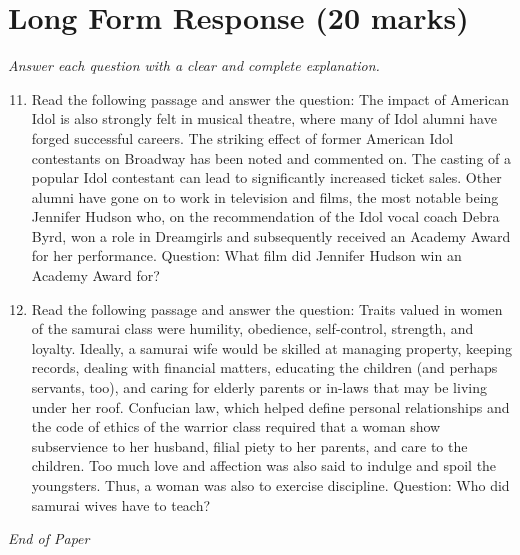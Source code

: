 \documentclass[12pt]{article}
\begin{document}
\section*{Long Form Response (20 marks)}
\textit{Answer each question with a clear and complete explanation.}
\begin{enumerate}[label=\arabic*.]
\setcounter{enumi}{10}
\item Read the following passage and answer the question: The impact of American Idol is also strongly felt in musical theatre, where many of Idol alumni have forged successful careers. The striking effect of former American Idol contestants on Broadway has been noted and commented on. The casting of a popular Idol contestant can lead to significantly increased ticket sales. Other alumni have gone on to work in television and films, the most notable being Jennifer Hudson who, on the recommendation of the Idol vocal coach Debra Byrd, won a role in Dreamgirls and subsequently received an Academy Award for her performance. Question: What film did Jennifer Hudson win an Academy Award for?
\item Read the following passage and answer the question: Traits valued in women of the samurai class were humility, obedience, self-control, strength, and loyalty. Ideally, a samurai wife would be skilled at managing property, keeping records, dealing with financial matters, educating the children (and perhaps servants, too), and caring for elderly parents or in-laws that may be living under her roof. Confucian law, which helped define personal relationships and the code of ethics of the warrior class required that a woman show subservience to her husband, filial piety to her parents, and care to the children. Too much love and affection was also said to indulge and spoil the youngsters. Thus, a woman was also to exercise discipline. Question: Who did samurai wives have to teach?
\end{enumerate}

\vfill
\noindent\textit{End of Paper}
\end{document}

